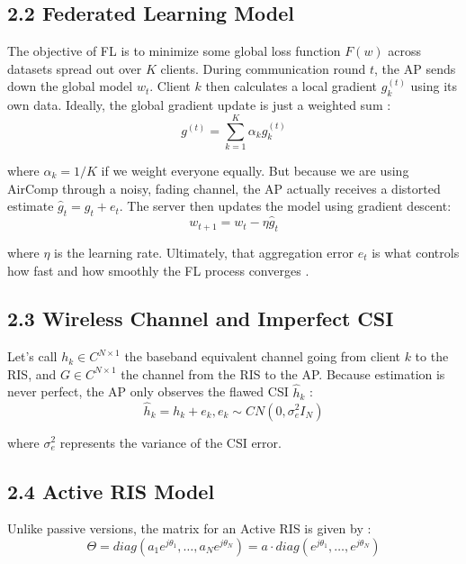 \documentclass[10pt,twocolumn]{article}
\begin{document}
\subsection{2.2	Federated Learning Model}

The objective of FL is to minimize some global loss function $F(w)$ across datasets spread out over $K$ clients. During communication round $t$, the AP sends down the global model $w_{t}$. Client $k$ then calculates a local gradient $g_{k}^{(t)}$ using its own data. Ideally, the global gradient update is just a weighted sum  \parencite{kwang_in_kim_3de81c66}:
\begin{displaymath}
g^{(t)}=\sum_{k=1}^{K} \alpha _{k}g_{k}^{(t)}
\end{displaymath}


where $\alpha _{k}=1/K$ if we weight everyone equally. But because we are using AirComp through a noisy, fading channel, the AP actually receives a distorted estimate $\hat{g}_{t}=g_{t}+e_{t}$. The server then updates the model using gradient descent:
\begin{displaymath}
w_{t+1}=w_{t}-\eta \hat{g}_{t}
\end{displaymath}


where $\eta$ is the learning rate. Ultimately, that aggregation error $e_{t}$ is what controls how fast and how smoothly the FL process converges  \parencite{xiaowen_cao_d1a16fb1}.
\subsection{2.3	Wireless Channel and Imperfect CSI}

Let’s call $h_{k}\in C^{N\times 1}$ the baseband equivalent channel going from client $k$ to the RIS, and $G\in C^{N\times 1}$ the channel from the RIS to the AP. Because estimation is never perfect, the AP only observes the flawed CSI $\hat{h}_{k}$  \parencite{hao_zhou_d3ae4bac}:
\begin{displaymath}
\hat{h}_{k}=h_{k}+e_{k}, e_{k}\sim CN(0,\sigma _{e}^{2}I_{N})
\end{displaymath}


where $\sigma _{e}^{2}$ represents the variance of the CSI error.
\subsection{2.4	Active RIS Model}

Unlike passive versions, the matrix for an Active RIS is given by  \parencite{zhiyuan_yu_9b3d9a51}:
\begin{displaymath}
\Theta =diag(a_{1}e^{j\theta _{1}},\ldots ,a_{N}e^{j\theta _{N}})=a\cdot diag(e^{j\theta _{1}},\ldots ,e^{j\theta _{N}})
\end{displaymath}
\end{document}
